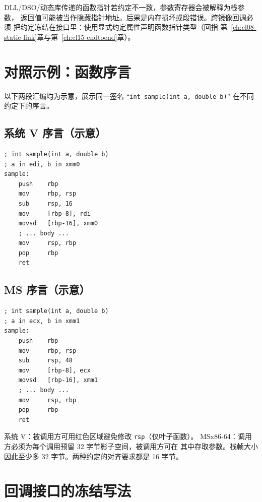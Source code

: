 \documentclass[12pt,a4paper,fontset=fandol]{ctexbook}
\newcommand{\Tp}[1]{\texttt{#1}}
\newcommand{\xSixtyFour}{\textsf{x86-64}}
\begin{document}
DLL/DSO/动态库传递的函数指针若约定不一致，参数寄存器会被解释为栈参数，
返回值可能被当作隐藏指针地址。后果是内存损坏或段错误。跨镜像回调必须
把约定冻结在接口里：使用显式约定属性声明函数指针类型（回指
第~\ref{ch:cl08-static-link}章与第~\ref{ch:cl15-endtoend}章）。

\section{对照示例：函数序言}\label{sec:cl10-prologue}

以下两段汇编均为示意，展示同一签名 ``\Tp{int sample(int a, double b)}''
在不同约定下的序言。

\subsection{系统 V 序言（示意）}\label{sec:cl10-prologue-sysv}

\begin{lstlisting}[style=asmstyle, caption={系统 V 序言（示意）}]
; int sample(int a, double b)
; a in edi, b in xmm0
sample:
    push    rbp
    mov     rbp, rsp
    sub     rsp, 16
    mov     [rbp-8], rdi
    movsd   [rbp-16], xmm0
    ; ... body ...
    mov     rsp, rbp
    pop     rbp
    ret
\end{lstlisting}

\subsection{MS 序言（示意）}\label{sec:cl10-prologue-ms}

\begin{lstlisting}[style=asmstyle, caption={MS 序言（示意）}]
; int sample(int a, double b)
; a in ecx, b in xmm1
sample:
    push    rbp
    mov     rbp, rsp
    sub     rsp, 48
    mov     [rbp-8], ecx
    movsd   [rbp-16], xmm1
    ; ... body ...
    mov     rsp, rbp
    pop     rbp
    ret
\end{lstlisting}

\begin{abibox}[title={序言差异}]
系统 V：被调用方可用红色区域避免修改 \Tp{rsp}（仅叶子函数）。
MS\xSixtyFour：调用方必须为每个调用预留 32 字节影子空间，被调用方可在
其中存取参数。栈帧大小因此至少多 32 字节。两种约定的对齐要求都是
16 字节。
\end{abibox}

\section{回调接口的冻结写法}\label{sec:cl10-callback-freeze}
\end{document}
